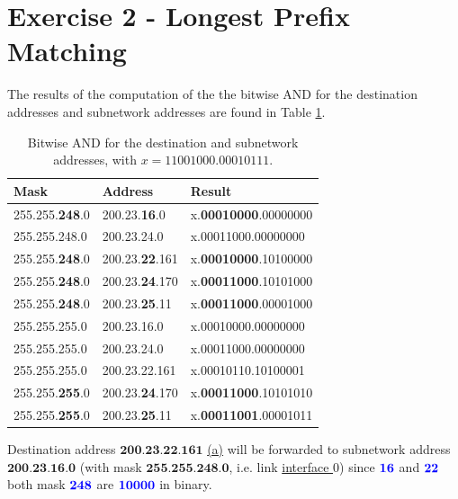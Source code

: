 \documentclass[10pt]{article}
\begin{document}
\section{Exercise 2 - Longest Prefix Matching} 
The results of the computation of the the bitwise AND for the destination addresses and subnetwork addresses are found in Table \ref{table:matching}.
\begin{table}[H]
  \centering
  \begin{tabular}{| l | l | l |}
    \hline
    \textbf{Mask} & \textbf{Address} & \textbf{Result} \\ \hline
    255.255.{\color{blue}\textbf{248}}.0 & 200.23.{\color{blue}\textbf{16}}.0 & x.{\color{blue}\textbf{00010000}}.00000000 \\ \hline
    255.255.248.0 & 200.23.24.0 & x.00011000.00000000 \\ \hline
    255.255.{\color{blue}\textbf{248}}.0 & 200.23.{\color{blue}\textbf{22}}.161 & x.{\color{blue}\textbf{00010000}}.10100000 \\ \hline
    255.255.{\color{teal}\textbf{248}}.0 & 200.23.{\color{teal}\textbf{24}}.170 & x.{\color{teal}\textbf{00011000}}.10101000 \\ \hline
    255.255.{\color{teal}\textbf{248}}.0 & 200.23.{\color{teal}\textbf{25}}.11 & x.{\color{teal}\textbf{00011000}}.00001000 \\ \hline
    255.255.255.0 & 200.23.16.0 & x.00010000.00000000 \\ \hline
    255.255.255.0 & 200.23.24.0 & x.00011000.00000000 \\ \hline
    255.255.255.0 & 200.23.22.161 & x.00010110.10100001 \\ \hline
    255.255.{\color{purple}\textbf{255}}.0 & 200.23.{\color{purple}\textbf{24}}.170 & x.{\color{purple}\textbf{00011000}}.10101010 \\ \hline
    255.255.{\color{purple}\textbf{255}}.0 & 200.23.{\color{purple}\textbf{25}}.11 & x.{\color{purple}\textbf{00011001}}.00001011 \\ \hline
  \end{tabular}
  \caption{Bitwise AND for the destination and subnetwork addresses, with $x=11001000.00010111$.}
  \label{table:matching}
\end{table}
Destination address $\textbf{200.23.22.161}$ \underline{(a)} will be forwarded to subnetwork address $\textbf{200.23.16.0}$ (with mask $\textbf{255.255.248.0}$, i.e. link \underline{interface $0$}) since ${\color{blue}\textbf{16}}$ and ${\color{blue}\textbf{22}}$ both mask ${\color{blue}\textbf{248}}$ are ${\color{blue}\textbf{10000}}$ in binary. \\
\end{document}
